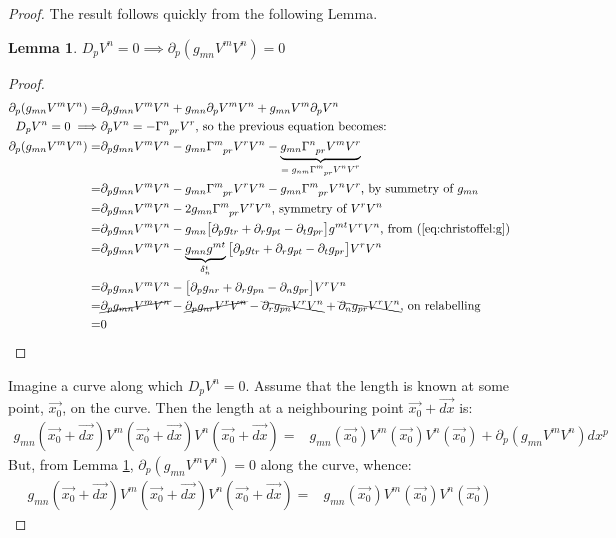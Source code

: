 \documentclass[]{article}
\newtheorem{lemma}[thm]{Lemma}
\begin{document}
{\begin{proof}
	The result follows quickly from the following Lemma.
	\begin{lemma}$D_pV^n=0 \implies \partial_p (g_{mn}V^mV^n)=0$\label{lemma:d:length}
	\end{lemma}
	\begin{proof}
		\begin{align*}
			\partial_p (g_{mn}V^mV^n)=&\partial_p g_{mn} V^m V^n + g_{mn} \partial_p V^m V^n + g_{mn}V^m  \partial_p V^n\\
			D_pV^n=0 \implies&\partial_p V^n = -\Gamma\indices{^n_{pr}}V^r \text{, so the previous equation becomes:}\\
			\partial_p (g_{mn}V^mV^n)=&\partial_p g_{mn} V^m V^n -g_{mn}\Gamma\indices{^m_{pr}}V^rV^n-\underbrace{g_{mn}\Gamma\indices{^n_{pr}}V^mV^r}_\text{$=g_{nm}\Gamma\indices{^m_{pr}}V^nV^r$}\\
			=&\partial_p g_{mn} V^m V^n -g_{mn}\Gamma\indices{^m_{pr}}V^rV^n-g_{mn}\Gamma\indices{^m_{pr}}V^nV^r \text{, by summetry of $g_{mn}$}\\
			=&\partial_p g_{mn} V^m V^n -2g_{mn}\Gamma\indices{^m_{pr}}V^rV^n \text{, symmetry of $V^rV^n$}\\
			=&\partial_p g_{mn} V^m V^n - g_{mn}\big[\partial_p g_{tr} +\partial_r g_{pt} -\partial_t g_{pr} \big]g^{mt}V^rV^n \text{, from (\ref{eq:christoffel:g})}\\
			=&\partial_p g_{mn} V^m V^n - \underbrace{g_{mn}g^{mt}}_{\delta_n^t}\big[\partial_p g_{tr} +\partial_r g_{pt} -\partial_t g_{pr} \big]V^rV^n
			\\
			=&\partial_p g_{mn} V^m V^n - \big[\partial_p g_{nr} +\partial_r g_{pn} -\partial_n g_{pr} \big]V^rV^n\\
			=&\cancel{\partial_p g_{mn} V^m V^n} - \cancel{\partial_p g_{nr}V^rV^n} -\bcancel{\partial_r g_{pn}V^rV^n} +\bcancel{\partial_n g_{pr} V^rV^n} \text{, on relabelling }\\
			=&0
		\end{align*}
	\end{proof}
	Imagine a curve along which $D_pV^n=0$.  Assume that the length is known at some point, $\vec{x_0}$, on the curve. Then the length at a neighbouring point $\vec{x_0}+\vec{dx}$ is:
	\begin{align*}
		g_{mn}(\vec{x_0}+\vec{dx})V^m(\vec{x_0}+\vec{dx})V^n(\vec{x_0}+\vec{dx})=&	g_{mn}(\vec{x_0})V^m(\vec{x_0})V^n(\vec{x_0})+ \partial_p (g_{mn}V^mV^n) dx^p
	\end{align*}
	But, from Lemma \ref{lemma:d:length}, $\partial_p (g_{mn}V^mV^n)=0$ along the curve, whence:
	\begin{align*}
		g_{mn}(\vec{x_0}+\vec{dx})V^m(\vec{x_0}+\vec{dx})V^n(\vec{x_0}+\vec{dx})=&	g_{mn}(\vec{x_0})V^m(\vec{x_0})V^n(\vec{x_0})
	\end{align*}
\end{proof}

}
\end{document}

